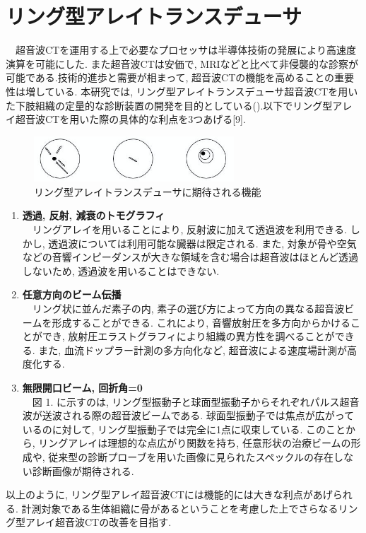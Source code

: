 \section{リング型アレイトランスデューサ} 
　超音波CTを運用する上で必要なプロセッサは半導体技術の発展により高速度演算を可能にした. また超音波CTは安価で, MRIなどと比べて非侵襲的な診察が可能である.技術的進歩と需要が相まって, 超音波CTの機能を高めることの重要性は増している.  本研究では, リング型アレイトランスデューサ超音波CTを用いた下肢組織の定量的な診断装置の開発を目的としている().以下でリング型アレイ超音波CTを用いた際の具体的な利点を3つあげる[9].
\begin{figure}[h]
  \begin{center}
    \includegraphics[width=75mm]{fig/three.jpg}
  \end{center}
  \caption{リング型アレイトランスデューサに期待される機能}
\end{figure}
\begin{enumerate}
\item{\bf 透過, 反射, 減衰のトモグラフィ}
\\\ \ リングアレイを用いることにより, 反射波に加えて透過波を利用できる. しかし, 透過波については利用可能な臓器は限定される. また, 対象が骨や空気などの音響インピーダンスが大きな領域を含む場合は超音波はほとんど透過しないため, 透過波を用いることはできない. 
\item{\bf 任意方向のビーム伝播}
\\\ \ リング状に並んだ素子の内, 素子の選び方によって方向の異なる超音波ビームを形成することができる. これにより, 音響放射圧を多方向からかけることができ, 放射圧エラストグラフィにより組織の異方性を調べることができる. また, 血流ドップラー計測の多方向化など, 超音波による速度場計測が高度化する. 
\item{\bf 無限開口ビーム, 回折角=0}
\\\ \ 図 1. に示すのは, リング型振動子と球面型振動子からそれぞれパルス超音波が送波される際の超音波ビームである. 球面型振動子では焦点が広がっているのに対して, リング型振動子では完全に1点に収束している. このことから, リングアレイは理想的な点広がり関数を持ち, 任意形状の治療ビームの形成や, 従来型の診断プローブを用いた画像に見られたスペックルの存在しない診断画像が期待される. 
\end{enumerate} 
以上のように, リング型アレイ超音波CTには機能的には大きな利点があげられる.  計測対象である生体組織に骨があるということを考慮した上でさらなるリング型アレイ超音波CTの改善を目指す. 

